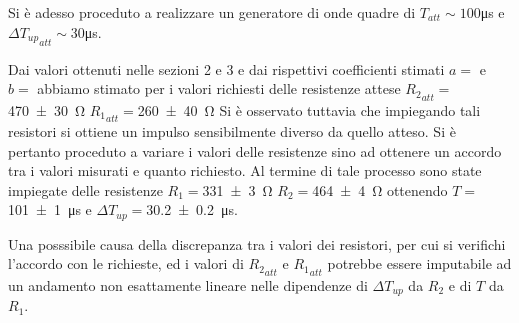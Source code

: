 	Si è adesso proceduto a realizzare un generatore di onde quadre di $T_{att}\sim 100$\si{\us} e $ \Delta {T_{up}}_{att}\sim 30$\si{\us}.

	Dai valori ottenuti nelle sezioni 2 e 3 e  dai rispettivi coefficienti stimati $a=$ e $b=$
		abbiamo stimato per i valori richiesti delle resistenze attese
	${R_{2}}_{att}=$\SI{470 \pm 30}{\ohm}%
	${R_{1}}_{att}=$\SI{260 \pm 40}{\ohm}%
	Si è osservato tuttavia che impiegando tali resistori si ottiene un impulso sensibilmente diverso da quello atteso.
	Si è pertanto proceduto a variare i valori delle resistenze sino ad ottenere un accordo tra i valori misurati e quanto richiesto.
	Al termine di tale processo sono state impiegate delle resistenze
	$R_{1}=$\SI{331 \pm 3}{\ohm}
	$R_{2}=$\SI{464 \pm 4}{\ohm}
	ottenendo
	$T=$\SI{101 \pm 1}{\us} e $ \Delta {T_{up}}=$\SI{30.2 \pm 0.2}{\us}.

	Una posssibile causa della discrepanza tra i valori dei resistori, per cui si verifichi l'accordo con le richieste, ed  i valori di ${R_{2}}_{att}$ e 	${R_{1}}_{att}$ potrebbe essere imputabile ad un andamento non esattamente lineare nelle dipendenze di $ \Delta T_{up}$ da $ R_{2}$ e di
	$T $ da $ R_{1} $.
